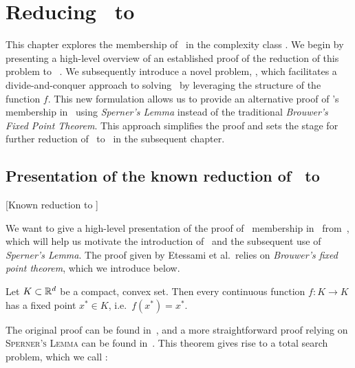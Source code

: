 \setchapterpreamble[u]{\margintoc}
\chapter{Reducing \Tarski\ to \PPAD}\label{ch:ppad_reduction}

This chapter explores the membership of \Tarski\ in the complexity class \PPAD\@. We begin by presenting a high-level overview of an established proof of the reduction of this problem to \Brouwer~\cite{etessami_tarskis_2020}. We subsequently introduce a novel problem, \Tarskistar, which facilitates a divide-and-conquer approach to solving \Tarski\ by leveraging the structure of the function $f$. This new formulation allows us to provide an alternative proof of \Tarski's membership in \PPAD\ using \textit{Sperner's Lemma} instead of the traditional \textit{Brouwer's Fixed Point Theorem}. This approach simplifies the proof and sets the stage for further reduction of \Tarskistar\ to \EOPL\ in the subsequent chapter.

\section{Presentation of the known reduction of \Tarski\ to \PPAD}[Known reduction to \PPAD]

We want to give a high-level presentation of the proof of \Tarski\ membership in \PPAD\ from~, which will help us motivate the introduction of \Tarskistar\ and the subsequent use of \textit{Sperner's Lemma}. The proof given by Etessami et al.\ relies on \textit{Brouwer's fixed point theorem}, which we introduce below.

\begin{theorem}
	Let $K \subset \mathbb{R}^d$ be a compact, convex set. Then every continuous function $f : K \rightarrow K$ has a fixed point $x^*  \in K$, i.e.\ $f(x^*) = x^*$.
\end{theorem}

The original proof can be found in~, and a more straightforward proof relying on \textsc{Sperner's Lemma} can be found in~. This theorem gives rise to a total search problem, which we call \Brouwer:

